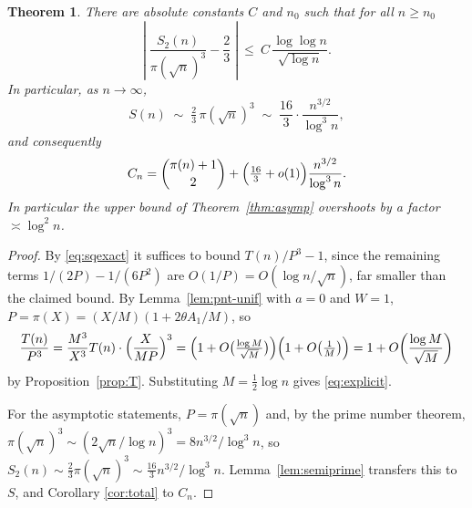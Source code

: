 \documentclass[a4paper,11pt,oneside,reqno]{amsart}
\theoremstyle{definition}
\theoremstyle{remark}
\theoremstyle{plain}
\newtheorem{theorem}[definition]{Theorem}
\begin{document}
\begin{theorem}\label{thm:error}
  There are absolute constants \(C\) and \(n_0\) such that for all \(n \ge n_0\)
  \begin{equation}\label{eq:explicit}
    \left|\;\frac{S_2(n)}{\pi(\sqrt n)^{3}}-\frac{2}{3}\;\right|
      \ \le \ C\,\frac{\log\log n}{\sqrt{\log n}} .
  \end{equation}
  In particular, as \(n \to \infty\),
  \[
    S(n)\;\sim \;\tfrac{2}{3}\,\pi(\sqrt n)^{3}
            \;\sim \;\frac{16}{3} \cdot \frac{n^{3/2}}{\log^{3}n},
  \]
  and consequently
  \[
    C_n = \binom{\pi(n)+1}{2}
        +\Bigl(\tfrac{16}{3}+o(1)\Bigr)\frac{n^{3/2}}{\log^{3}n}.
  \]
  In particular the upper bound of Theorem~\ref{thm:asymp} overshoots by a
  factor \(\asymp\log^{2}n\).
\end{theorem}

\begin{proof}
  By \eqref{eq:sqexact} it suffices to bound \(T(n)/P^{3}-1\), since the
  remaining terms \(1/(2P)-1/(6P^{2})\) are \(O(1/P) = O(\log n/\sqrt n)\), far
  smaller than the claimed bound. By Lemma~\ref{lem:pnt-unif} with \(a = 0\) and
  \(W = 1\), \(P = \pi(X) = (X/M)(1+2\theta A_1/M)\), so
  \[
    \frac{T(n)}{P^{3}} = \frac{M^{3}}{X^{3}}T(n) \cdot \Bigl(\frac{X}{MP}\Bigr)^{3}
      =\Bigl(1+O\bigl(\tfrac{\log M}{\sqrt M}\bigr)\Bigr)
       \Bigl(1+O\bigl(\tfrac{1}{M}\bigr)\Bigr)
      =1+O\!\left(\frac{\log M}{\sqrt M}\right)
  \]
  by Proposition~\ref{prop:T}. Substituting \(M = \tfrac{1}{2}\log n\) gives
  \eqref{eq:explicit}.

  For the asymptotic statements, \(P = \pi(\sqrt n)\) and, by the prime number
  theorem, \(\pi(\sqrt n)^{3} \sim (2\sqrt n/\log n)^{3} = 8n^{3/2}/\log^{3}n\),
  so \(S_2(n) \sim \tfrac{2}{3}\pi(\sqrt n)^{3} \sim \tfrac{16}{3}n^{3/2}/\log^{3}n\).
  Lemma~\ref{lem:semiprime} transfers this to \(S\), and Corollary
  \ref{cor:total} to \(C_n\).
\end{proof}
\end{document}

